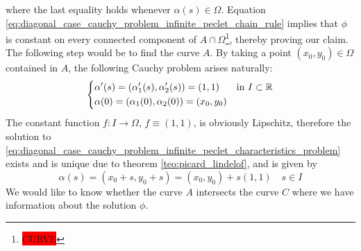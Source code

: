 where the last equality holds whenever $\alpha(s) \in \Omega$. Equation
\eqref{eq:diagonal_case_cauchy_problem_infinite_peclet_chain_rule} implies that
$\phi$ is constant on every connected component of $A \cap
\Omega$\footnote{\colorbox{red}{CURVE}}, thereby proving our claim. The
following step would be to find the curve $A$. By taking a point $(x_0, y_0) \in
\Omega$ contained in $A$, the following Cauchy problem arises naturally:
\begin{equation} \label{eq:diagonal_case_cauchy_problem_infinite_peclet_characteristics_problem}
	\left\{
		\begin{aligned}
			&\alpha'(s) = 
			(\alpha_1'(s), \alpha_2'(s)) = 
			(1,1) & &\text{in } I \subset \mathbb{R} \\
			&\alpha(0) = 
			(\alpha_1(0), \alpha_2(0)) = 
			(x_0, y_0)
		\end{aligned}
	\right.
\end{equation}
The constant function $f \colon I \rightarrow \Omega$, $f \equiv (1, 1)$, is
obviously Lipschitz, therefore the solution to
\eqref{eq:diagonal_case_cauchy_problem_infinite_peclet_characteristics_problem}
exists and is unique due to theorem \ref{teo:picard_lindelof}, and is given by
\begin{equation}
	\alpha(s) = (x_0 + s, y_0 + s) = (x_0, y_0) + s(1, 1) \quad s \in I
\end{equation}
We would like to know whether the curve $A$ intersects the curve $C$ where we
have information about the solution $\phi$. 




